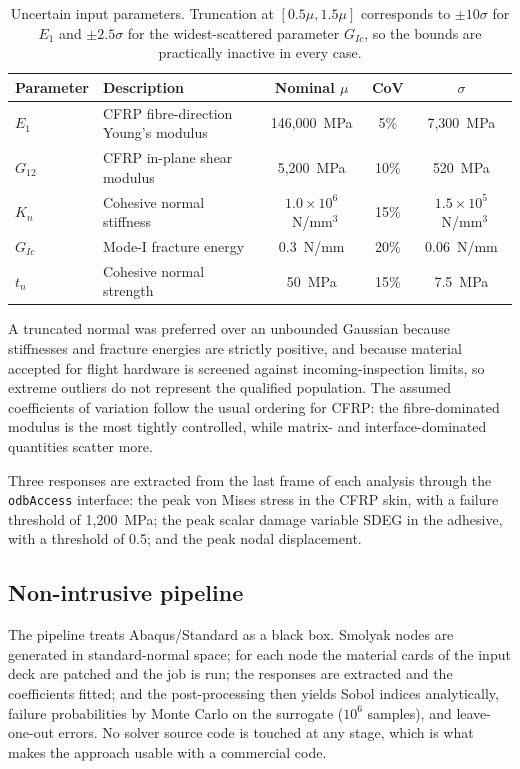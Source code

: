 \documentclass[review,3p,times,12pt,nopreprintline]{elsarticle}
\begin{document}
\begin{table}[htb]
\centering
\caption{Uncertain input parameters. Truncation at $[0.5\mu,1.5\mu]$ corresponds to
$\pm10\sigma$ for $E_1$ and $\pm2.5\sigma$ for the widest-scattered parameter $G_{Ic}$, so
the bounds are practically inactive in every case.}
\begin{tabular}{llccc}
\toprule
Parameter & Description & Nominal $\mu$ & CoV & $\sigma$ \\
\midrule
$E_1$    & CFRP fibre-direction Young's modulus & 146{,}000~MPa & 5\%  & 7{,}300~MPa \\
$G_{12}$ & CFRP in-plane shear modulus          & 5{,}200~MPa   & 10\% & 520~MPa \\
$K_n$    & Cohesive normal stiffness            & $1.0\times10^6$~N/mm$^3$ & 15\% & $1.5\times10^5$~N/mm$^3$ \\
$G_{Ic}$ & Mode-I fracture energy               & 0.3~N/mm      & 20\% & 0.06~N/mm \\
$t_n$    & Cohesive normal strength             & 50~MPa        & 15\% & 7.5~MPa \\
\bottomrule
\end{tabular}
\label{tab:params}
\end{table}

A truncated normal was preferred over an unbounded Gaussian because stiffnesses and
fracture energies are strictly positive, and because material accepted for flight hardware
is screened against incoming-inspection limits, so extreme outliers do not represent the
qualified population. The assumed coefficients of variation follow the usual ordering for
CFRP: the fibre-dominated modulus is the most tightly controlled, while matrix- and
interface-dominated quantities scatter more.

Three responses are extracted from the last frame of each analysis through the
\texttt{odbAccess} interface: the peak von Mises stress in the CFRP skin, with a failure
threshold of 1{,}200~MPa; the peak scalar damage variable SDEG in the adhesive, with a
threshold of 0.5; and the peak nodal displacement.

\subsection{Non-intrusive pipeline}

The pipeline treats Abaqus/Standard as a black box. Smolyak nodes are generated in
standard-normal space; for each node the material cards of the input deck are patched and
the job is run; the responses are extracted and the coefficients fitted; and the
post-processing then yields Sobol indices analytically, failure probabilities by Monte
Carlo on the surrogate ($10^6$ samples), and leave-one-out errors. No solver source code is
touched at any stage, which is what makes the approach usable with a commercial code.
\end{document}
